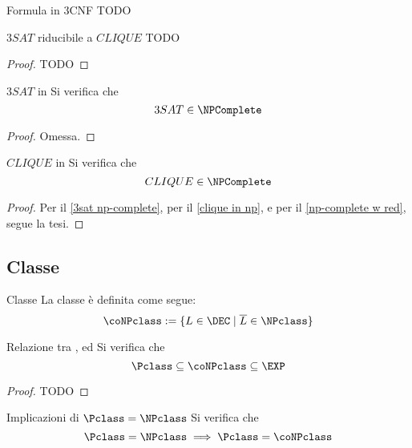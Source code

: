 \documentclass[a4paper, 12pt]{report}
\begin{document}
    \begin{frameddefn}{Formula in 3CNF}
        TODO
    \end{frameddefn}

    \begin{framedthm}{$3SAT$ riducibile a $CLIQUE$}
        TODO
    \end{framedthm}

    \begin{proof}
        TODO
    \end{proof}

    \begin{framedthm}[label={3sat np-complete}]{$3SAT$ in \NPComplete}
        Si verifica che $$3SAT \in \NPComplete$$
    \end{framedthm}

    \begin{proof}
        Omessa.
    \end{proof}

    \begin{framedcor}{$CLIQUE$ in \NPComplete}
        Si verifica che $$CLIQUE \in \NPComplete$$
    \end{framedcor}

    \begin{proof}
        Per il \cref{3sat np-complete}, per il \cref{clique in np}, e per il \cref{np-complete w red}, segue la tesi.
    \end{proof}

    \subsection{Classe \coNPclass}

    \begin{frameddefn}{Classe \coNPclass}
        La classe \coNPclass è definita come segue: $$\coNPclass := \{L \in \DEC \mid \overline L \in \NPclass\}$$
    \end{frameddefn}

    \begin{framedprop}[label={ho finito i nomi}]{Relazione tra \Pclass, \coNPclass ed \EXP}
        Si verifica che $$\Pclass \subseteq \coNPclass \subseteq \EXP$$
    \end{framedprop}

    \begin{proof}
        TODO
    \end{proof}

    \begin{framedthm}[label={p = np impl 1}]{Implicazioni di $\Pclass = \NPclass$}
        Si verifica che $$\Pclass = \NPclass \implies \Pclass = \coNPclass$$
    \end{framedthm}
\end{document}

